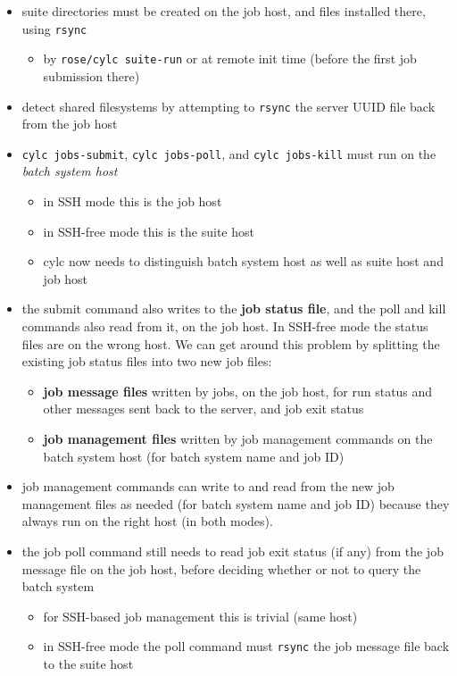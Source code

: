 \documentclass{article}
\begin{document}
\begin{itemize}
  \item suite directories must be created on the job host, and files installed
    there, using \lstinline=rsync=
    \begin{itemize}
      \item by \lstinline=rose/cylc suite-run= or at
        remote init time (before the first job submission there)
    \end{itemize}

  \item detect shared filesystems by attempting to \lstinline=rsync= the server
    UUID file back from the job host

  \item \lstinline=cylc jobs-submit=, \lstinline=cylc jobs-poll=, and
    \lstinline=cylc jobs-kill= must run on the {\em batch system host}
    \begin{itemize}
      \item in SSH mode this is the job host
      \item in SSH-free mode this is the suite host
      \item cylc now needs to distinguish batch system host as well as suite
        host and job host
    \end{itemize}

  \item the submit command also writes to the {\bf job status file}, and the
    poll and kill commands also read from it, on the job host. In SSH-free mode
    the status files are on the wrong host. We can get around this problem by
    splitting the existing job status files into two new job files:
    \begin{itemize}
      \item {\bf job message files} written by jobs, on the job host, for run
        status and other messages sent back to the server, and job exit status
      \item {\bf job management files} written by job management commands on
        the batch system host (for batch system name and job ID)
    \end{itemize}

  \item job management commands can write to and read from the new job
    management files as needed (for batch system name and job ID) because they
    always run on the right host (in both modes).

  \item the job poll command still needs to read job exit status (if any) from
    the job message file on the job host, before deciding whether or not to
    query the batch system
    \begin{itemize}
      \item for SSH-based job management this is trivial (same host)
      \item in SSH-free mode the poll command must \lstinline=rsync=
        the job message file back to the suite host
    \end{itemize}


\end{itemize}
\end{document}
